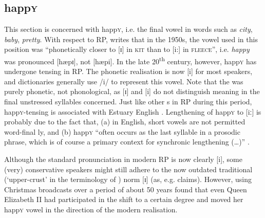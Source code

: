 		\subsection{happ\textsc{y}}\label{sec.var.vow.happy}

This section is concerned with happ\textsc{y}, i.e. the final vowel in words such as \emph{city}, \emph{baby}, \emph{pretty}.
With respect to RP, \citet[441]{harrington2006} writes that in the 1950s, the vowel used in this position was ``phonetically closer to [ɪ] in \textsc{kit} than to [i:] in \textsc{fleece}'', i.e. \emph{happy} was pronounced [hæpɪ], not [hæpi].
In the late 20\textsuperscript{th} century, however, happ\textsc{y} has undergone tensing in RP.
The phonetic realisation is now [i] for most speakers, and dictionaries generally use /i/ to represent this vowel.
Note that the  was purely phonetic, not phonological, as [ɪ] and [i] do not distinguish meaning in the final unstressed syllables concerned.
Just like other s in RP during this period, happ\textsc{y}-tensing is associated with Estuary English \citep[cf.][]{wells1997}.
Lengthening of happ\textsc{y} to [iː] is probably due to the fact that, (a) in English, short vowels are not permitted word-final ly, and (b) happ\textsc{y} ``often occurs as the last syllable in a prosodic phrase, which is of course a primary context for synchronic lengthening (\ldots)'' \citep[441]{harrington2006}.

Although the standard pronunciation in modern RP is now clearly [i], some (very) conservative speakers might still adhere to the now outdated traditional (`upper-crust' in the terminology of \citealt{wells1982}) norm [ɪ] (as, e.g. \cite{trudgill1999} claims).
However, using Christmas broadcasts over a period of about 50 years \citet[cf.][452]{harrington2006} found that even Queen Elizabeth II had participated in the shift to a certain degree and moved her happ\textsc{y} vowel in the direction of the modern realisation.


